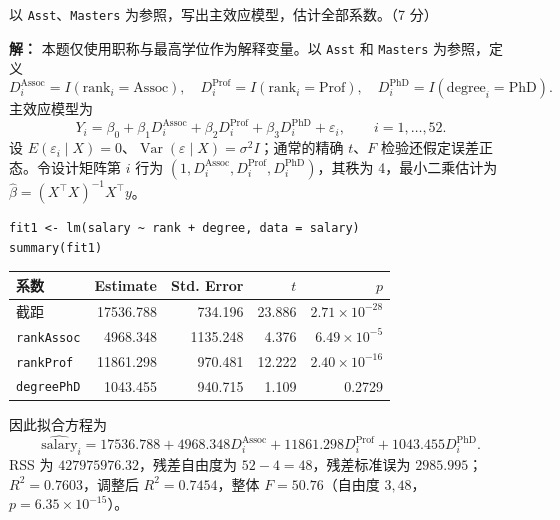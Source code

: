\documentclass[12pt,a4paper]{article}
\begin{document}
\subsection{}

以 \texttt{Asst}、\texttt{Masters} 为参照，写出主效应模型，估计全部系数。（7 分）
\begin{answerbox}
\textbf{解：}
本题仅使用职称与最高学位作为解释变量。以 \texttt{Asst} 和 \texttt{Masters} 为参照，定义
$$
D_i^{\mathrm{Assoc}}=I(\mathrm{rank}_i=\mathrm{Assoc}),\quad
D_i^{\mathrm{Prof}}=I(\mathrm{rank}_i=\mathrm{Prof}),\quad
D_i^{\mathrm{PhD}}=I(\mathrm{degree}_i=\mathrm{PhD}).
$$
主效应模型为
$$
Y_i=\beta_0+\beta_1D_i^{\mathrm{Assoc}}+\beta_2D_i^{\mathrm{Prof}}
+\beta_3D_i^{\mathrm{PhD}}+\varepsilon_i,\qquad i=1,\ldots,52.
$$
设 $E(\varepsilon_i\mid X)=0$、$\operatorname{Var}(\varepsilon\mid X)=\sigma^2I$；通常的精确 $t$、$F$ 检验还假定误差正态。令设计矩阵第 $i$ 行为
$(1,D_i^{\mathrm{Assoc}},D_i^{\mathrm{Prof}},D_i^{\mathrm{PhD}})$，其秩为 4，最小二乘估计为
$\hat\beta=(X^\top X)^{-1}X^\top y$。
\begin{lstlisting}[style=rcode]
fit1 <- lm(salary ~ rank + degree, data = salary)
summary(fit1)
\end{lstlisting}
\begin{center}
\small
\begin{tabular}{lrrrr}
\toprule
系数 & Estimate & Std. Error & $t$ & $p$ \\
\midrule
截距 & 17536.788 & 734.196 & 23.886 & $2.71\times10^{-28}$ \\
\texttt{rankAssoc} & 4968.348 & 1135.248 & 4.376 & $6.49\times10^{-5}$ \\
\texttt{rankProf} & 11861.298 & 970.481 & 12.222 & $2.40\times10^{-16}$ \\
\texttt{degreePhD} & 1043.455 & 940.715 & 1.109 & 0.2729 \\
\bottomrule
\end{tabular}
\end{center}
因此拟合方程为
$$
\widehat{\mathrm{salary}}_i
=17536.788+4968.348D_i^{\mathrm{Assoc}}
+11861.298D_i^{\mathrm{Prof}}+1043.455D_i^{\mathrm{PhD}}.
$$
RSS 为 $427975976.32$，残差自由度为 $52-4=48$，残差标准误为 $2985.995$；
$R^2=0.7603$，调整后 $R^2=0.7454$，整体 $F=50.76$（自由度 $3,48$，$p=6.35\times10^{-15}$）。

\end{answerbox}



\subsection{}
\end{document}
